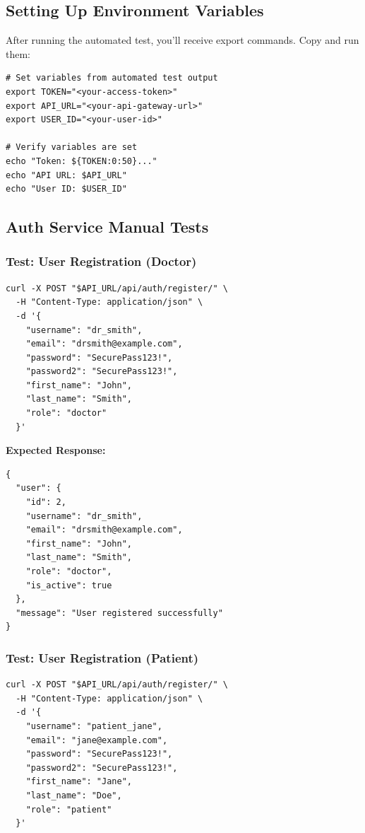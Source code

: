 \documentclass[12pt,a4paper]{article}
\begin{document}
\subsection{Setting Up Environment Variables}
After running the automated test, you'll receive export commands. Copy and run them:

\begin{lstlisting}[style=bash]
# Set variables from automated test output
export TOKEN="<your-access-token>"
export API_URL="<your-api-gateway-url>"
export USER_ID="<your-user-id>"

# Verify variables are set
echo "Token: ${TOKEN:0:50}..."
echo "API URL: $API_URL"
echo "User ID: $USER_ID"
\end{lstlisting}

\subsection{Auth Service Manual Tests}

\subsubsection{Test: User Registration (Doctor)}
\begin{lstlisting}[style=bash]
curl -X POST "$API_URL/api/auth/register/" \
  -H "Content-Type: application/json" \
  -d '{
    "username": "dr_smith",
    "email": "drsmith@example.com",
    "password": "SecurePass123!",
    "password2": "SecurePass123!",
    "first_name": "John",
    "last_name": "Smith",
    "role": "doctor"
  }'
\end{lstlisting}

\textbf{Expected Response:}
\begin{lstlisting}[style=json]
{
  "user": {
    "id": 2,
    "username": "dr_smith",
    "email": "drsmith@example.com",
    "first_name": "John",
    "last_name": "Smith",
    "role": "doctor",
    "is_active": true
  },
  "message": "User registered successfully"
}
\end{lstlisting}

\subsubsection{Test: User Registration (Patient)}
\begin{lstlisting}[style=bash]
curl -X POST "$API_URL/api/auth/register/" \
  -H "Content-Type: application/json" \
  -d '{
    "username": "patient_jane",
    "email": "jane@example.com",
    "password": "SecurePass123!",
    "password2": "SecurePass123!",
    "first_name": "Jane",
    "last_name": "Doe",
    "role": "patient"
  }'
\end{lstlisting}
\end{document}
